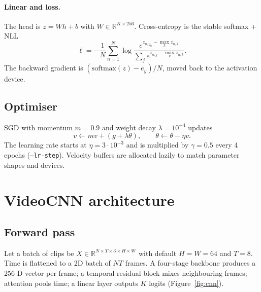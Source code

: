 \documentclass[11pt,a4paper]{article}
\begin{document}
\paragraph{Linear and loss.}
The head is $z = W h + b$ with $W\in\mathbb{R}^{K\times 256}$.
Cross-entropy is the stable softmax + NLL
\[
  \ell = -\frac{1}{N}\sum_{n=1}^{N}\log
  \frac{e^{z_{n,y_n}-\max_k z_{n,k}}}
       {\sum_{j} e^{z_{n,j}-\max_k z_{n,k}}}.
\]
The backward gradient is $(\mathrm{softmax}(z)-e_y)/N$, moved back to the
activation device.

\subsection{Optimiser}

SGD with momentum $m=0.9$ and weight decay $\lambda=10^{-4}$ updates
\[
  v \leftarrow m v + (g + \lambda \theta),\qquad
  \theta \leftarrow \theta - \eta v.
\]
The learning rate starts at $\eta=3\cdot 10^{-3}$ and is multiplied by
$\gamma=0.5$ every 4 epochs (\texttt{--lr-step}).
Velocity buffers are allocated lazily to match parameter shapes and
devices.

\section{VideoCNN architecture}
\label{sec:model}

\subsection{Forward pass}

Let a batch of clips be $X\in\mathbb{R}^{N\times T\times 3\times H\times W}$
with default $H=W=64$ and $T=8$.
Time is flattened to a 2D batch of $NT$ frames.
A four-stage backbone produces a 256-D vector per frame; a temporal
residual block mixes neighbouring frames; attention pools time; a linear
layer outputs $K$ logits (Figure~\ref{fig:cnn}).
\end{document}
